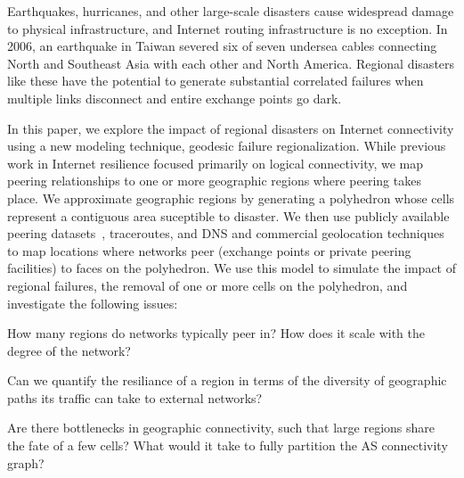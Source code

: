 

Earthquakes, hurricanes, and other large-scale disasters cause widespread damage
to physical infrastructure, and Internet routing infrastructure is no exception.
In 2006, an earthquake in Taiwan severed six of seven 
undersea cables connecting North and Southeast Asia with each other and North 
America. 
Regional disasters like these have the potential to generate substantial 
correlated failures when multiple links disconnect and entire exchange points
go dark.


In this paper, we explore the impact of regional disasters on Internet
connectivity using a new modeling technique, geodesic failure regionalization.
While previous work in Internet resilience focused primarily on logical
connectivity, we map peering relationships to one or more geographic regions
where peering takes place.  We approximate geographic regions by generating a
polyhedron whose cells represent a contiguous area suceptible to disaster.  We
then use publicly available peering datasets~\cite{ixps-mapped, peeringdb},
traceroutes, and DNS and commercial geolocation techniques to map locations
where networks peer (exchange points or private peering facilities) to faces on
the polyhedron.  We use this model to simulate the impact of regional failures,
\ie{} the removal of one or more cells on the polyhedron, and investigate the following issues:

 How many regions do networks
typically peer in? How does it scale with the degree of the network?

 Can we quantify the resiliance of a
region in terms of the diversity of geographic paths its traffic can take to external networks?

 Are there bottlenecks in geographic connectivity, such that large regions share the fate of a few cells?
    What would it take to fully partition the AS connectivity graph?

